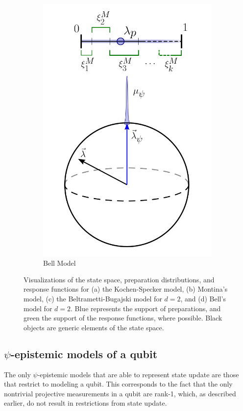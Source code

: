 \documentclass[%
 reprint, onecolumn, 12pt,
superscriptaddress,
nofootinbib,
 prx, 
]{quantumarticle}
\begin{document}
\begin{figure}[t]
\begin{subfigure}[t]{0.24\textwidth}
 \includegraphics[width=\textwidth]{Bell_model_v2.png}
 \caption{Bell Model}
 \label{fig:Bellmodel}
 \end{subfigure}
 \caption{Visualizations of the state space, preparation
   distributions, and response functions for (a) the Kochen-Specker
   model, (b) Montina's model, (c) the Beltrametti-Bugajski model for
   $d=2$, and (d) Bell's model for $d=2$. Blue represents the support
   of preparations, and green the support of the response functions,
   where possible. Black objects are generic elements of the state
   space.}
  \label{fig:models}
\end{figure} 

\subsection{$\psi$-epistemic models of a qubit}
The only $\psi$-epistemic models that are able to represent state
update are those that restrict to modeling a qubit. This corresponds
to the fact that the only nontrivial projective measurements in a
qubit are rank-1, which, as described earlier, do not result in
restrictions from state update.
\end{document}

